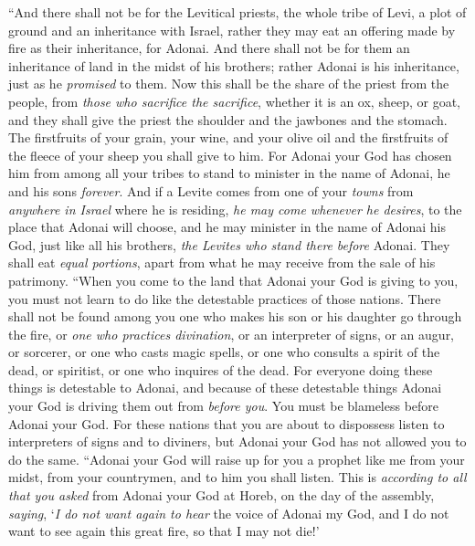 \begin{biblechapter} %
\verse “And there shall not be for the Levitical priests, the whole tribe of Levi, a plot of ground and an inheritance with Israel, rather they may eat an offering made by fire as their inheritance, for Adonai.
\verse And there shall not be for them an inheritance of land in the midst of his brothers; rather Adonai is his inheritance, just as he \textit{promised} to them.
\verse Now this shall be the share of the priest from the people, from \textit{those who sacrifice the sacrifice}, whether it is an ox, sheep, or goat, and they shall give the priest the shoulder and the jawbones and the stomach.
\verse The firstfruits of your grain, your wine, and your olive oil and the firstfruits of the fleece of your sheep you shall give to him.
\verse For Adonai your God has chosen him from among all your tribes to stand to minister in the name of Adonai, he and his sons \textit{forever}.
\verse And if a Levite comes from one of your \textit{towns} from \textit{anywhere in Israel} where he is residing, \textit{he may come whenever he desires}, to the place that Adonai will choose,
\verse and he may minister in the name of Adonai his God, just like all his brothers, \textit{the Levites who stand there} \textit{before} Adonai.
\verse They shall eat \textit{equal portions}, apart from what he may receive from the sale of his patrimony.
\verse “When you come to the land that Adonai your God is giving to you, you must not learn to do like the detestable practices of those nations.
\verse There shall not be found among you one who makes his son or his daughter go through the fire, or \textit{one who practices divination}, or an interpreter of signs, or an augur, or sorcerer,
\verse or one who casts magic spells, or one who consults a spirit of the dead, or spiritist, or one who inquires of the dead.
\verse For everyone doing these things is detestable to Adonai, and because of these detestable things Adonai your God is driving them out from \textit{before you}.
\verse You must be blameless before Adonai your God.
\verse For these nations that you are about to dispossess listen to interpreters of signs and to diviners, but Adonai your God has not allowed you to do the same.
\verse “Adonai your God will raise up for you a prophet like me from your midst, from your countrymen, and to him you shall listen.
\verse This is \textit{according to all that you asked} from Adonai your God at Horeb, on the day of the assembly, \textit{saying}, ‘\textit{I do not want again to hear} the voice of Adonai my God, and I do not want to see again this great fire, so that I may not die!’

\end{biblechapter}
